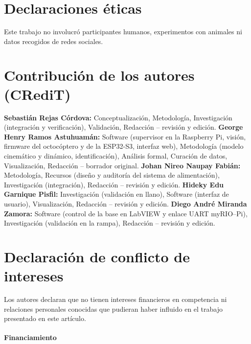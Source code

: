 \section*{Declaraciones éticas}
Este trabajo no involucró participantes humanos, experimentos con animales ni datos recogidos de redes sociales.

\section*{Contribución de los autores (CRediT)}
\textbf{Sebastián Rejas Córdova:} Conceptualización, Metodología, Investigación (integración y verificación), Validación, Redacción -- revisión y edición.
\textbf{George Henry Ramos Astuhuamán:} Software (supervisor en la Raspberry Pi, visión, firmware del octocóptero y de la ESP32-S3, interfaz web), Metodología (modelo cinemático y dinámico, identificación), Análisis formal, Curación de datos, Visualización, Redacción -- borrador original.
\textbf{Johan Nireo Naupay Fabián:} Metodología, Recursos (diseño y auditoría del sistema de alimentación), Investigación (integración), Redacción -- revisión y edición.
\textbf{Hideky Edu Garnique Pisfil:} Investigación (validación en llano), Software (interfaz de usuario), Visualización, Redacción -- revisión y edición.
\textbf{Diego André Miranda Zamora:} Software (control de la base en LabVIEW y enlace UART myRIO--Pi), Investigación (validación en la rampa), Redacción -- revisión y edición.

\section*{Declaración de conflicto de intereses}
Los autores declaran que no tienen intereses financieros en competencia ni relaciones personales conocidas que pudieran haber influido en el trabajo presentado en este artículo.

\paragraph{Financiamiento}

